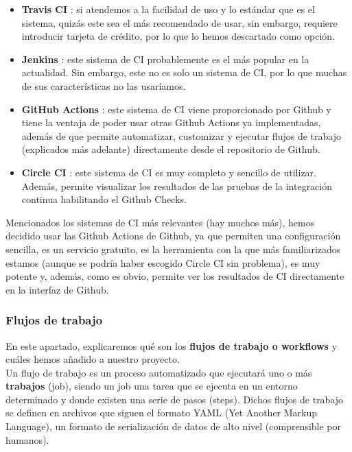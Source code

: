     \begin{itemize}
        \item \textbf{Travis CI} \cite{travis-ci}: si atendemos a la facilidad de uso y lo
        estándar que es el sistema, quizás este sea el más recomendado de usar, sin embargo,
        requiere introducir tarjeta de crédito, por lo que lo hemos descartado como opción.
        \item \textbf{Jenkins} \cite{jenkins}: este sistema de CI probablemente es el más
        popular en la actualidad. Sin embargo, este no es solo un sistema de CI, por lo
        que muchas de sus características no las usaríamos.
        \item \textbf{GitHub Actions} \cite{github-actions}: este sistema de CI viene
        proporcionado por Github y tiene la ventaja de poder usar otras Github Actions ya
        implementadas, además de que permite automatizar, customizar y ejecutar flujos de
        trabajo (explicados más adelante) directamente desde el repositorio de Github.
        \item \textbf{Circle CI} \cite{circle-ci}: este sistema de CI es muy completo y
        sencillo de utilizar. Además, permite visualizar los resultados de las pruebas de la
        integración continua habilitando el Github Checks.
    \end{itemize}

    Mencionados los sistemas de CI más relevantes (hay muchos más), hemos decidido usar las
    Github Actions de Github, ya que permiten una configuración sencilla, es un servicio
    gratuito, es la herramienta con la que más familiarizados estamos (aunque se podría haber
    escogido Circle CI sin problema), es muy potente y, además, como es obvio, permite ver los
    resultados de CI directamente en la interfaz de Github.

\subsubsection{Flujos de trabajo}
En este apartado, explicaremos qué son los \textbf{flujos de trabajo o workflows} y cuáles
hemos añadido a nuestro proyecto.\\

Un flujo de trabajo es un proceso automatizado que ejecutará uno o más \textbf{trabajos}
(job), siendo un job una tarea que se ejecuta en un entorno determinado y donde existen una
serie de pasos (steps). Dichos flujos de trabajo se definen en archivos que siguen el formato
YAML (Yet Another Markup Language), un formato de serialización de datos de alto nivel
(comprensible por humanos).\\

